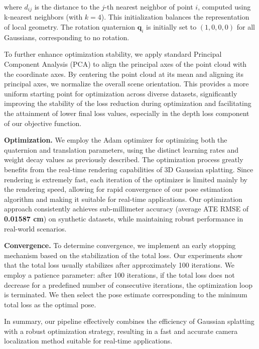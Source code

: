 \documentclass[twocolumn]{article}
\begin{document}
where \(d_{ij}\) is the distance to the \(j\)-th nearest neighbor of
point \(i\), computed using k-nearest neighbors (with \(k=4\)). This
initialization balances the representation of local geometry. The
rotation quaternion \(\mathbf{q}_i\) is initially set to
\((1, 0, 0, 0)\) for all Gaussians, corresponding to no rotation.

To further enhance optimization stability, we apply standard Principal
Component Analysis (PCA) to align the principal axes of the point cloud
with the coordinate axes. By centering the point cloud at its mean and
aligning its principal axes, we normalize the overall scene orientation.
This provides a more uniform starting point for optimization across
diverse datasets, significantly improving the stability of the loss
reduction during optimization and facilitating the attainment of lower
final loss values, especially in the depth loss component of our
objective function.

\textbf{Optimization.} We employ the
Adam\autocite{kingmaAdamMethodStochastic2014} optimizer for optimizing
both the quaternion and translation parameters, using the distinct
learning rates and weight decay values as previously described. The
optimization process greatly benefits from the real-time rendering
capabilities of 3D Gaussian splatting. Since rendering is extremely
fast, each iteration of the optimizer is limited mainly by the rendering
speed, allowing for rapid convergence of our pose estimation algorithm
and making it suitable for real-time applications. Our optimization
approach consistently achieves sub-millimeter accuracy (average ATE RMSE
of \textbf{0.01587 cm}) on synthetic datasets, while maintaining robust
performance in real-world scenarios.

\textbf{Convergence.} To determine convergence, we implement an early
stopping mechanism based on the stabilization of the total loss. Our
experiments show that the total loss usually stabilizes after
approximately 100 iterations. We employ a patience parameter: after 100
iterations, if the total loss does not decrease for a predefined number
of consecutive iterations, the optimization loop is terminated. We then
select the pose estimate corresponding to the minimum total loss as the
optimal pose.

In summary, our pipeline effectively combines the efficiency of Gaussian
splatting with a robust optimization strategy, resulting in a fast and
accurate camera localization method suitable for real-time applications.
\end{document}
